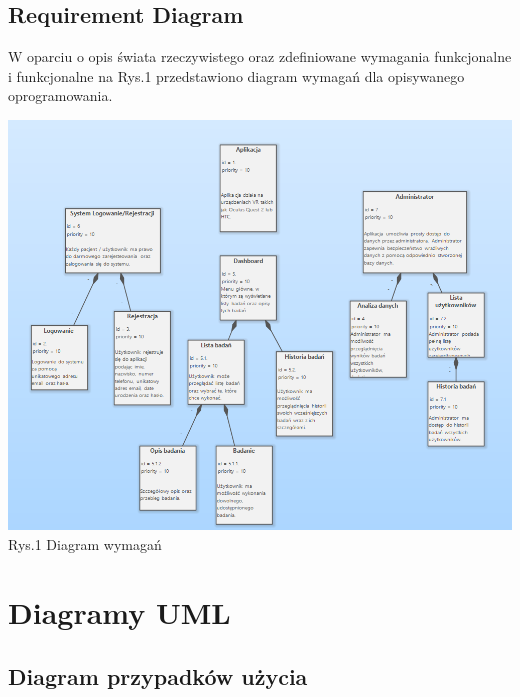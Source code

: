 \documentclass[12pt, letterpaper]{article}
\begin{document}
			
		\subsection{Requirement Diagram}
		
		W oparciu o opis świata rzeczywistego oraz zdefiniowane wymagania funkcjonalne i funkcjonalne na Rys.1 przedstawiono diagram wymagań dla opisywanego oprogramowania.
		
		\begin{center}
			\includegraphics[scale=0.5]{req_diagram}\\
			\caption{Rys.1 Diagram wymagań}
		\end{center}
		
		
		\section{Diagramy UML}
		\subsection{Diagram przypadków użycia}
		
\end{document}
